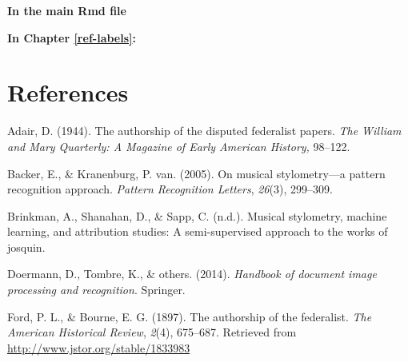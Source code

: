 \documentclass[12pt,twoside]{reedthesis}
\theoremstyle{definition}
\theoremstyle{definition}
\theoremstyle{definition}
\theoremstyle{remark}
\begin{document}
\textbf{In the main Rmd file}
\begin{Shaded}
\begin{Highlighting}[]
\NormalTok{(}\OperatorTok{!}
  \NormalTok{(}\NormalTok{, } \NormalTok{)}
\NormalTok{(}\OperatorTok{!}
\OperatorTok{::}\NormalTok{(}\NormalTok{)}
\end{Highlighting}
\end{Shaded}
\textbf{In Chapter \ref{ref-labels}:}

\backmatter

\chapter*{References}\label{references}


\noindent

\setlength{\parindent}{-0.20in} \setlength{\leftskip}{0.20in}
\setlength{\parskip}{8pt}

\hypertarget{refs}{}
\hypertarget{ref-adair1944}{}
Adair, D. (1944). The authorship of the disputed federalist papers.
\emph{The William and Mary Quarterly: A Magazine of Early American
History,} 98--122.

\hypertarget{ref-backer2005}{}
Backer, E., \& Kranenburg, P. van. (2005). On musical stylometry---a
pattern recognition approach. \emph{Pattern Recognition Letters},
\emph{26}(3), 299--309.

\hypertarget{ref-brinkman2016}{}
Brinkman, A., Shanahan, D., \& Sapp, C. (n.d.). Musical stylometry,
machine learning, and attribution studies: A semi-supervised approach to
the works of josquin.

\hypertarget{ref-OMR}{}
Doermann, D., Tombre, K., \& others. (2014). \emph{Handbook of document
image processing and recognition}. Springer.

\hypertarget{ref-authorshipfed}{}
Ford, P. L., \& Bourne, E. G. (1897). The authorship of the federalist.
\emph{The American Historical Review}, \emph{2}(4), 675--687. Retrieved
from \url{http://www.jstor.org/stable/1833983}
\end{document}
